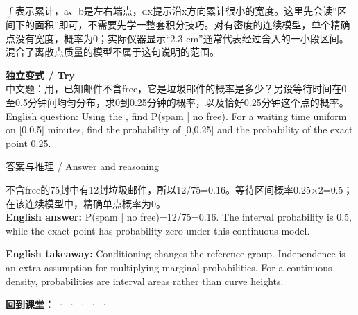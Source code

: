 \ensuremath{\int}表示累计，a、b是左右端点，dx提示沿x方向累计很小的宽度。这里先会读“区间下的面积”即可，不需要先学一整套积分技巧。对有密度的连续模型，单个精确点没有宽度，概率为0；实际仪器显示“2.3 cm”通常代表经过舍入的一小段区间。混合了离散点质量的模型不属于这句说明的范围。


\textbf{独立变式 / Try}\\

中文题：用，已知邮件不含free，它是垃圾邮件的概率是多少？另设等待时间在0至0.5分钟间均匀分布，求0到0.25分钟的概率，以及恰好0.25分钟这个点的概率。\\

English question: Using the , find P(spam | no free). For a waiting time uniform on [0,0.5] minutes, find the probability of [0,0.25] and the probability of the exact point 0.25.



\begin{StudySolution}{答案与推理 / Answer and reasoning}


不含free的75封中有12封垃圾邮件，所以12/75=0.16。等待区间概率0.25\ensuremath{\times}2=0.5；在该连续模型中，精确单点概率为0。\\

\textbf{English answer:} P(spam | no free)=12/75=0.16. The interval probability is 0.5, while the exact point has probability zero under this continuous model.


\end{StudySolution}


\textbf{English takeaway:} Conditioning changes the reference group. Independence is an extra assumption for multiplying marginal probabilities. For a continuous density, probabilities are interval areas rather than curve heights.


\textbf{回到课堂：}  ·  ·  ·  ·  · 









